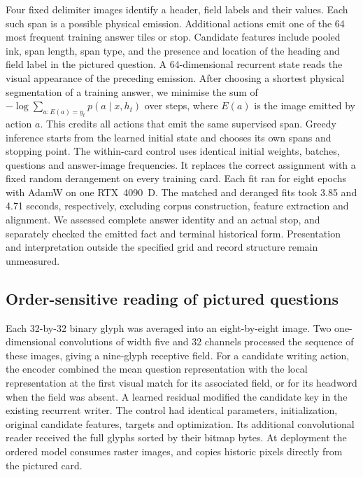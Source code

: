 \documentclass[12pt,a4paper]{article}
\providecommand{\DIFadd}[1]{{\protect\color{blue} \sf #1}} %
\begin{document}
\DIFadd{Four fixed delimiter images identify a header, field labels and their values. Each such span is a possible physical emission. Additional actions emit one of the 64 most frequent training answer tiles or stop. Candidate features include pooled ink, span length, span type, and the presence and location of the heading and field label in the pictured question. A 64-dimensional recurrent state reads the visual appearance of the preceding emission. After choosing a shortest physical segmentation of a training answer, we minimise the sum of $-\log\sum_{a:E(a)=y_t}p(a\mid x,h_t)$ over steps, where $E(a)$ is the image emitted by action $a$. This credits all actions that emit the same supervised span. Greedy inference starts from the learned initial state and chooses its own spans and stopping point. The within-card control uses identical initial weights, batches, questions and answer-image frequencies. It replaces the correct assignment with a fixed random derangement on every training card. Each fit ran for eight epochs with AdamW on one RTX~4090~D. The matched and deranged fits took 3.85 and 4.71 seconds, respectively, excluding corpus construction, feature extraction and alignment. We assessed complete answer identity and an actual stop, and separately checked the emitted fact and terminal historical form. Presentation and interpretation outside the specified grid and record structure remain unmeasured.
}

\subsection*{\DIFadd{Order-sensitive reading of pictured questions}}
\DIFadd{Each 32-by-32 binary glyph was averaged into an eight-by-eight image. Two one-dimensional convolutions of width five and 32 channels processed the sequence of these images, giving a nine-glyph receptive field. For a candidate writing action, the encoder combined the mean question representation with the local representation at the first visual match for its associated field, or for its headword when the field was absent. A learned residual modified the candidate key in the existing recurrent writer. The control had identical parameters, initialization, original candidate features, targets and optimization. Its additional convolutional reader received the full glyphs sorted by their bitmap bytes. At deployment the ordered model consumes raster images, and copies historic pixels directly from the pictured card.
}
\end{document}
